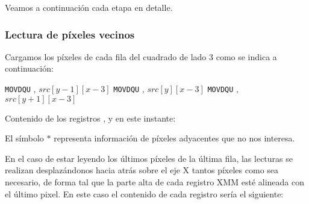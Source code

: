 Veamos a continuación cada etapa en detalle.




\subsubsection{Lectura de píxeles vecinos}

Cargamos los píxeles de cada fila del cuadrado de lado 3 como se indica a continuación:

\begin{pseudocodigo}
    \STATE \texttt{MOVDQU} , $src[y-1][x-3]$
    \STATE \texttt{MOVDQU} , $src[y][x-3]$
    \STATE \texttt{MOVDQU} , $src[y+1][x-3]$        
\end{pseudocodigo}

Contenido de los registros ,  y  en este instante:

\begin{center}
\end{center}

El símbolo $\ast$ representa información de píxeles adyacentes que no nos interesa.

En el caso de estar leyendo los últimos píxeles de la última fila, las lecturas
se realizan desplazándonos hacia atrás sobre el eje X tantos píxeles como sea
necesario, de forma tal que la parte alta de cada registro XMM esté alineada
con el último pixel. En este caso el contenido de cada registro sería
el siguiente:

\begin{center}
\end{center}

